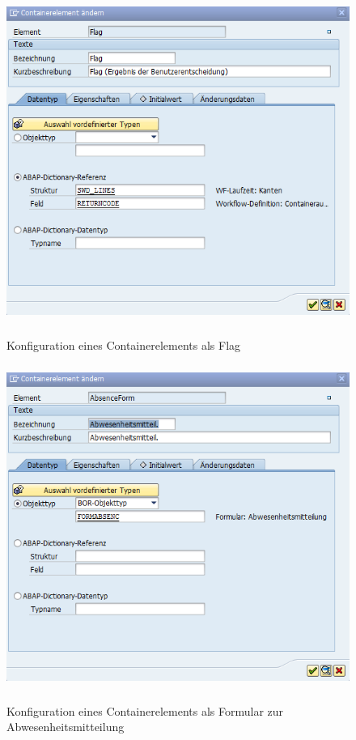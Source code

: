 \begin{figure}[H]
	\begin{center}
	\includegraphics[height=400px]{grafiken/wf-builder_bsp2_container-flag.png}
	\caption{Konfiguration eines Containerelements als Flag}
	\vspace{-10pt}
	\label{abb:workflow-bsp2-container-flag}
	\end{center}
\end{figure}

\begin{figure}[H]
	\begin{center}
	\includegraphics[height=400px]{grafiken/wf-builder_bsp2_container-form.png}
	\caption{Konfiguration eines Containerelements als Formular zur Abwesenheitsmitteilung}
	\vspace{-10pt}
	\label{abb:workflow-bsp2-container-form}
	\end{center}
\end{figure}

